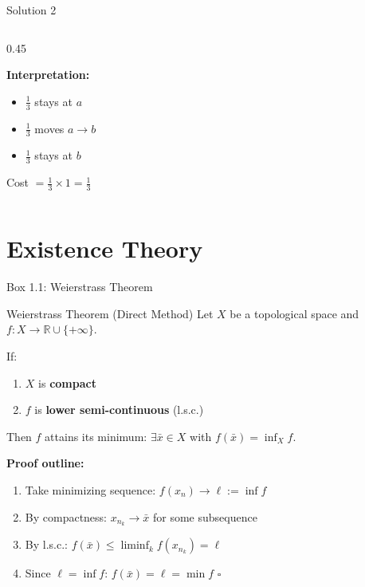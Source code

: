 \documentclass[aspectratio=169]{beamer}
\newcommand{\R}{\mathbb{R}}
\begin{document}
\begin{frame}{Solution 2}
\begin{columns}
\begin{column}{0.45\textwidth}
\begin{center}

\vspace{0.3cm}
\textbf{Interpretation:}
\begin{itemize}
    \item $\frac{1}{3}$ stays at $a$
    \item $\frac{1}{3}$ moves $a \to b$
    \item $\frac{1}{3}$ stays at $b$
\end{itemize}

Cost $= \frac{1}{3} \times 1 = \frac{1}{3}$
\end{center}
\end{column}
\end{columns}
\end{frame}

\section{Existence Theory}

\begin{frame}{Box 1.1: Weierstrass Theorem}
\begin{block}{Weierstrass Theorem (Direct Method)}
Let $X$ be a topological space and $f: X \to \R \cup \{+\infty\}$.

If:
\begin{enumerate}
    \item $X$ is \textbf{compact}
    \item $f$ is \textbf{lower semi-continuous} (l.s.c.)
\end{enumerate}

Then $f$ attains its minimum: $\exists \bar{x} \in X$ with $f(\bar{x}) = \inf_X f$.
\end{block}

\vspace{0.3cm}
\textbf{Proof outline:}
\begin{enumerate}
    \item Take minimizing sequence: $f(x_n) \to \ell := \inf f$
    \item By compactness: $x_{n_k} \to \bar{x}$ for some subsequence
    \item By l.s.c.: $f(\bar{x}) \leq \liminf_{k} f(x_{n_k}) = \ell$
    \item Since $\ell = \inf f$: $f(\bar{x}) = \ell = \min f$ \quad $\square$
\end{enumerate}
\end{frame}
\end{document}
